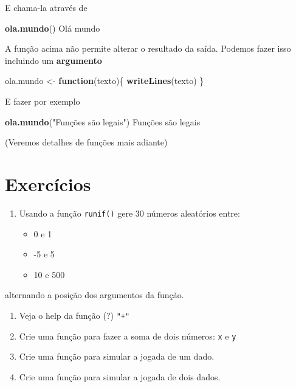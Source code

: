 \documentclass[10pt,a4paper]{book}
\newenvironment{Shaded}{\begin{snugshade}}{\end{snugshade}}
\newcommand{\KeywordTok}[1]{\textcolor[rgb]{0.13,0.29,0.53}{\textbf{#1}}}
\newcommand{\StringTok}[1]{\textcolor[rgb]{0.31,0.60,0.02}{#1}}
\newcommand{\ControlFlowTok}[1]{\textcolor[rgb]{0.13,0.29,0.53}{\textbf{#1}}}
\newcommand{\NormalTok}[1]{#1}
\providecommand{\tightlist}{%
  \setlength{\itemsep}{0pt}\setlength{\parskip}{0pt}}
\begin{document}
E chama-la através de

\begin{Shaded}
\begin{Highlighting}[]
\KeywordTok{ola.mundo}\NormalTok{()}
\NormalTok{Olá mundo}
\end{Highlighting}
\end{Shaded}

A função acima não permite alterar o resultado da saída. Podemos fazer
isso incluindo um \textbf{argumento}

\begin{Shaded}
\begin{Highlighting}[]
\NormalTok{ola.mundo <-}\StringTok{ }\ControlFlowTok{function}\NormalTok{(texto)\{}
    \KeywordTok{writeLines}\NormalTok{(texto)}
\NormalTok{\}}
\end{Highlighting}
\end{Shaded}

E fazer por exemplo

\begin{Shaded}
\begin{Highlighting}[]
\KeywordTok{ola.mundo}\NormalTok{(}\StringTok{"Funções são legais"}\NormalTok{)}
\NormalTok{Funções são legais}
\end{Highlighting}
\end{Shaded}

(Veremos detalhes de funções mais adiante)

\section*{Exercícios}\label{exercuxedcios-1}


\begin{enumerate}
\def\labelenumi{\arabic{enumi}.}
\tightlist
\item
  Usando a função \texttt{runif()} gere \(30\) números aleatórios entre:

  \begin{itemize}
  \tightlist
  \item
    0 e 1
  \item
    -5 e 5
  \item
    10 e 500
  \end{itemize}
\end{enumerate}

alternando a posição dos argumentos da função.

\begin{enumerate}
\def\labelenumi{\arabic{enumi}.}
\setcounter{enumi}{1}
\tightlist
\item
  Veja o help da função (?) \texttt{"+"}
\item
  Crie uma função para fazer a soma de dois números: \texttt{x} e
  \texttt{y}
\item
  Crie uma função para simular a jogada de um dado.
\item
  Crie uma função para simular a jogada de dois dados.
\end{enumerate}
\end{document}
